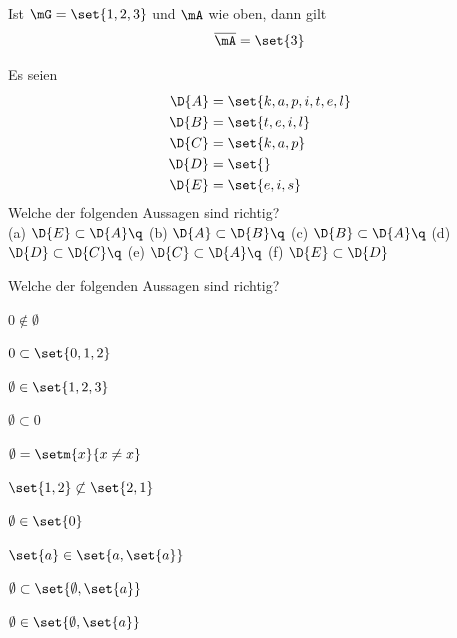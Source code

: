 \documentclass[%
11pt,%
twoside,%
titlepage,%
german,%
]{scrartcl}
\begin{document}
\begin{bsp}
Ist $\mG=\set{1,2,3}$ und $\mA$ wie oben, dann gilt
$$\overline{\mA}=\set{3}$$
\end{bsp}

\begin{ueb}[Kapitel]
Es seien
\begin{align}
\D{A}&=\set{k,a,p,i,t,e,l}\notag\\
\D{B}&=\set{t,e,i,l}\notag\\
\D{C}&=\set{k,a,p}\notag\\
\D{D}&=\set{}\notag\\
\D{E}&=\set{e,i,s}\notag
\end{align}
Welche der folgenden Aussagen sind richtig?\\

(a) $\D{E}\subset\D{A}\q$ (b) $\D{A}\subset\D{B}\q$ (c) $\D{B}\subset\D{A}\q$ (d) $\D{D}\subset\D{C}\q$ (e) $\D{C}\subset\D{A}\q$ (f) $\D{E}\subset\D{D}$

\end{ueb}

\begin{ueb}
Welche der folgenden Aussagen sind richtig?\\[2ex]
\hspace*{2.7ex}
\begin{minipage}{0.4\textwidth}
\begin{enumeratea}
\item $0\notin\emptyset$
\item $0\subset\set{0,1,2}$
\item $\emptyset\in\set{1,2,3}$
\item $\emptyset\subset{0}$
\item $\emptyset=\setm{x}{x\neq x}$
\end{enumeratea}
\end{minipage}
\begin{minipage}{0.3\textwidth}
\begin{enumeratea}\addtocounter{enumi}{5}
\item $\set{1,2}\not\subset\set{2,1}$
\item $\emptyset\in\set{0}$
\item $\set{a}\in\set{a,\set{a}}$
\item $\emptyset\subset\set{\emptyset,\set{a}}$
\item $\emptyset\in\set{\emptyset,\set{a}}$
\end{enumeratea}
\end{minipage}
\end{ueb}
\end{document}
